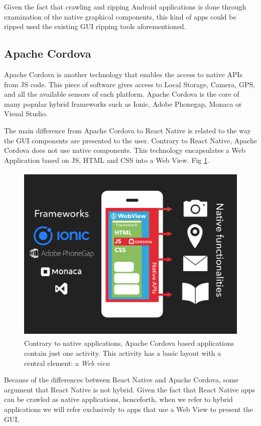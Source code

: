Given the fact that crawling and ripping Android applications is done through examination of the native graphical components, this kind of apps could be ripped used the existing GUI ripping tools aforementioned.

\subsection{Apache Cordova}
Apache Cordova is another technology that enables the access to native APIs from JS code. This piece of software gives access to Local Storage, Camera, GPS, and all the available sensors of each platform. Apache Cordova is the core of many popular hybrid frameworks such as Ionic, Adobe Phonegap, Monaca or Visual Studio. 

The main difference from Apache Cordova to React Native is related to the way the GUI components are presented to the user. Contrary to React Native, Apache Cordova does not use native components. This technology encapsulates a Web Application based on JS, HTML and CSS into a Web View. Fig \ref{hybridCordova}.

\begin{figure}[t]
	\centering
	\includegraphics[width=1\textwidth]{img/hybrid.pdf}
	\vspace{-0.8cm}
	\caption{Contrary to native applications, Apache Cordova based applications contain just one activity. This activity has a basic layout with a central element: a \textit{Web view}}
	\label{hybridCordova}
\end{figure} 


Because of the differences between React Native and Apache Cordova, some argument that React Native is not hybrid. Given the fact that React Native apps can be crawled as native applications, henceforth, when we refer to hybrid applications we will refer exclusively to apps that use a Web View to present the GUI.

